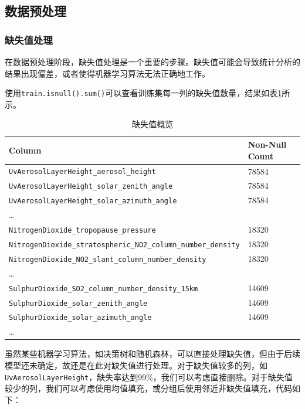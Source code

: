 \documentclass{ctexart}
\begin{document}
\subsection{数据预处理}

\subsubsection{缺失值处理}

在数据预处理阶段，缺失值处理是一个重要的步骤。缺失值可能会导致统计分析的结果出现偏差，或者使得机器学习算法无法正确地工作。

使用\verb|train.isnull().sum()|可以查看训练集每一列的缺失值数量，结果如表\ref{tab:1}所示。

\begin{table}[h]
      \centering
      \begin{tabular}{l|l}
      \hline
      Column & Non-Null Count \\ \hline
      \texttt{UvAerosolLayerHeight\_aerosol\_height} & 78584 \\
      \texttt{UvAerosolLayerHeight\_solar\_zenith\_angle} & 78584 \\
      \texttt{UvAerosolLayerHeight\_solar\_azimuth\_angle} & 78584 \\
      \ldots{} & \\
      \texttt{NitrogenDioxide\_tropopause\_pressure} & 18320 \\
      \texttt{NitrogenDioxide\_stratospheric\_NO2\_column\_number\_density} & 18320 \\
      \texttt{NitrogenDioxide\_NO2\_slant\_column\_number\_density} & 18320 \\
      \ldots{} & \\
      \texttt{SulphurDioxide\_SO2\_column\_number\_density\_15km} & 14609 \\
      \texttt{SulphurDioxide\_solar\_zenith\_angle} & 14609 \\
      \texttt{SulphurDioxide\_solar\_azimuth\_angle} & 14609 \\
      \ldots{} & \\
      \hline
      \end{tabular}
      \caption{\label{tab:1}缺失值概览}
\end{table}

虽然某些机器学习算法，如决策树和随机森林，可以直接处理缺失值，但由于后续模型还未确定，故还是在此对缺失值进行处理。对于缺失值较多的列，如\texttt{UvAerosolLayerHeight}，缺失率达到99\%，我们可以考虑直接删除。对于缺失值较少的列，我们可以考虑使用均值填充，或分组后使用邻近非缺失值填充，代码如下：
\end{document}
